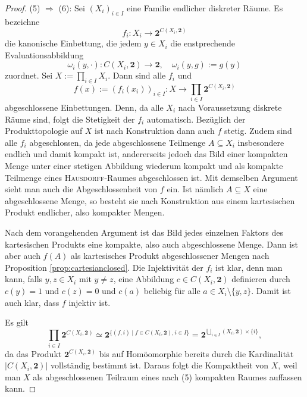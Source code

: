 \begin{proof}
  (5) $\Rightarrow$ (6):
  Sei $(X_i)_{i \in I}$ eine Familie endlicher diskreter Räume.
  Es bezeichne
  \begin{displaymath}
    f_i \colon X_i \to \mathbf{2}^{C(X_i,\mathbf{2})}
  \end{displaymath}
  die kanonische Einbettung, die jedem  $y \in X_i$ die enstprechende Evaluationsabbildung
  \begin{displaymath}
    \omega_i(y,\cdot) \colon C(X_i,\mathbf{2}) \to \mathbf{2}, \quad \omega_i(y,g) := g(y)
  \end{displaymath}
  zuordnet.
  Sei $X := \prod_{i \in I} X_i$.
  Dann sind alle $f_i$  und
  \begin{displaymath}
    f(x) := (f_i(x_i))_{i \in I} \colon X \to \prod_{i \in I} \mathbf{2}^{C(X_i,\mathbf{2})}
  \end{displaymath}
  abgeschlossene Einbettungen.
  Denn, da alle $X_i$ nach Voraussetzung diskrete Räume sind, folgt die Stetigkeit der $f_i$ automatisch.
  Bezüglich der Produkttopologie auf $X$ ist nach Konstruktion dann auch $f$ stetig.
  Zudem sind alle $f_i$ abgeschlossen, da jede abgeschlossene Teilmenge $A \subseteq X_i$ insbesondere endlich und damit kompakt ist, andererseits jedoch das Bild einer kompakten Menge unter einer stetigen Abbildung wiederum kompakt und als kompakte Teilmenge eines \textsc{Hausdorff}\hyp{}Raumes abgeschlossen ist.  
  Mit demselben Argument sieht man auch die Abgeschlossenheit von $f$ ein.
  Ist nämlich $A \subseteq X$ eine abgeschlossene Menge, so besteht sie nach Konstruktion aus einem kartesischen Produkt endlicher, also kompakter Mengen.

  Nach dem vorangehenden Argument ist das Bild jedes einzelnen Faktors des kartesischen Produkts eine kompakte, also auch abgeschlossene Menge.
  Dann ist aber auch $f(A)$ als kartesisches Produkt abgeschlossener Mengen nach Proposition \ref{prop:cartesianclosed}.
  Die Injektivität der $f_i$ ist klar, denn man kann, falls $y,z \in X_i$ mit $y \neq z$, eine Abbildung $c \in C(X_i,\mathbf{2})$ definieren durch $c(y) = 1$ und $c(z) = 0$ und $c(a)$ beliebig für alle $a \in X_i \setminus \{y,z\}$.
  Damit ist auch klar, dass $f$ injektiv ist.
   
  Es gilt 
  \begin{displaymath}
    \prod_{i \in I} \mathbf{2}^{C(X_i,\mathbf{2})} 
    \simeq \mathbf{2}^{\{(f,i) \mid f \in C(X_i,\mathbf{2}), i \in I\}}
    = \mathbf{2}^{\bigcup_{i \in I} (X_i,\mathbf{2}) \times \{i\}},
  \end{displaymath}
  da das Produkt $\mathbf{2}^{C(X_i,\mathbf{2})}$ bis auf Homöomorphie bereits durch die Kardinalität $|C( X_i, \mathbf{2} )|$ vollständig bestimmt ist.
  Daraus folgt die Kompaktheit von $X$, weil man $X$ als abgeschlossenen Teilraum eines nach (5) kompakten Raumes auffassen kann.


\end{proof}
